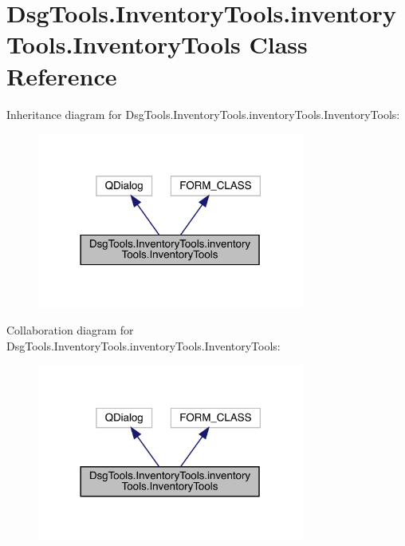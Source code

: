\hypertarget{class_dsg_tools_1_1_inventory_tools_1_1inventory_tools_1_1_inventory_tools}{}\section{Dsg\+Tools.\+Inventory\+Tools.\+inventory\+Tools.\+Inventory\+Tools Class Reference}
\label{class_dsg_tools_1_1_inventory_tools_1_1inventory_tools_1_1_inventory_tools}


Inheritance diagram for Dsg\+Tools.\+Inventory\+Tools.\+inventory\+Tools.\+Inventory\+Tools\+:
\nopagebreak
\begin{figure}[H]
\begin{center}
\leavevmode
\includegraphics[width=249pt]{class_dsg_tools_1_1_inventory_tools_1_1inventory_tools_1_1_inventory_tools__inherit__graph}
\end{center}
\end{figure}


Collaboration diagram for Dsg\+Tools.\+Inventory\+Tools.\+inventory\+Tools.\+Inventory\+Tools\+:
\nopagebreak
\begin{figure}[H]
\begin{center}
\leavevmode
\includegraphics[width=249pt]{class_dsg_tools_1_1_inventory_tools_1_1inventory_tools_1_1_inventory_tools__coll__graph}
\end{center}
\end{figure}
